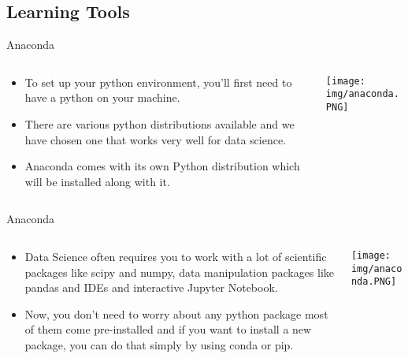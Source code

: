 \documentclass[11pt]{beamer}
\begin{document}
\subsection{Learning Tools}
\begin{frame}{Anaconda}
\begin{columns}[T] %
\begin{column}{.48\textwidth}
		\begin{itemize}
\item To set up your python environment, you’ll first need to have a python on your machine. 

\item There are various python distributions available and we have chosen one that works very well for data science. 

\item Anaconda comes with its own Python distribution which will be installed along with it. 
		\end{itemize}
\end{column}%
\hfill%
\begin{column}{.48\textwidth}
		\texttt{[image: img/anaconda.PNG]}
\end{column}%
\end{columns}
\end{frame}
\begin{frame}{Anaconda}
\begin{columns}[T] %
\begin{column}{.48\textwidth}
		\begin{itemize}
\item Data Science often requires you to work with a lot of scientific packages like scipy and numpy, data manipulation packages like pandas and IDEs and interactive Jupyter Notebook.

\item Now, you don’t need to worry about any python package most of them come pre-installed and if you want to install a new package, you can do that simply by using conda or pip. 
		\end{itemize}
\end{column}%
\hfill%
\begin{column}{.48\textwidth}
		\texttt{[image: img/anaconda.PNG]}
\end{column}%
\end{columns}
\end{frame}
\end{document}
